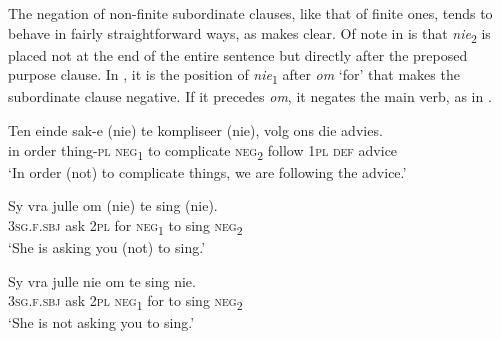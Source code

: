 \documentclass[output=paper,colorlinks,citecolor=brown]{langscibook}
\begin{document}
The negation of non-finite subordinate clauses, like that of finite ones, tends to behave in fairly straightforward ways, as  makes clear. Of note in  is that \textit{nie}\textsubscript{2} is placed not at the end of the entire sentence but directly after the preposed purpose clause. In , it is the position of \textit{nie}\textsubscript{1} after \textit{om} ‘for’ that makes the subordinate clause negative. If it precedes \textit{om}, it negates the main verb, as in .

\ea\label{ex:afr:22}
    \ea\label{ex:afr:22a}
        \gll Ten einde sak-e (nie) te kompliseer (nie), volg ons die advies. \\ 
             in order thing-\textsc{pl} \textsc{neg}\textsubscript{1} to  complicate  \textsc{neg}\textsubscript{2} follow \textsc{1pl} \textsc{def} advice \\
        \glt ‘In order (not) to complicate things, we are following the advice.’
    
    \ex\label{ex:afr:22b}
        \gll Sy vra julle om (nie) te sing (nie). \\
             \textsc{3sg.f.sbj} ask \textsc{2pl} for    \textsc{neg}\textsubscript{1} to  sing  \textsc{neg}\textsubscript{2} \\
        \glt ‘She is asking you (not) to sing.’
        
    \ex\label{ex:afr:22c}
        \gll Sy vra julle nie om te sing nie. \\
             \textsc{3sg.f.sbj} ask  \textsc{2pl} \textsc{neg}\textsubscript{1} for to sing  \textsc{neg}\textsubscript{2}\\
        \glt ‘She is not asking you to sing.’
    \z
\z
\end{document}
